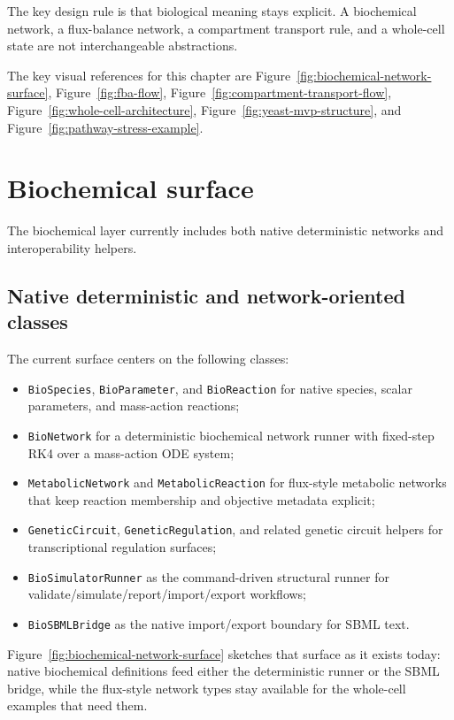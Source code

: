 The key design rule is that biological meaning stays explicit. A biochemical
network, a flux-balance network, a compartment transport rule, and a whole-cell
state are not interchangeable abstractions.

The key visual references for this chapter are Figure~\ref{fig:biochemical-network-surface},
Figure~\ref{fig:fba-flow},
Figure~\ref{fig:compartment-transport-flow},
Figure~\ref{fig:whole-cell-architecture},
Figure~\ref{fig:yeast-mvp-structure}, and
Figure~\ref{fig:pathway-stress-example}.

\section{Biochemical surface}

The biochemical layer currently includes both native deterministic networks and
interoperability helpers.

\subsection{Native deterministic and network-oriented classes}

The current surface centers on the following classes:
\begin{itemize}
\item \texttt{BioSpecies}, \texttt{BioParameter}, and \texttt{BioReaction} for
      native species, scalar parameters, and mass-action reactions;
\item \texttt{BioNetwork} for a deterministic biochemical network runner with
      fixed-step RK4 over a mass-action ODE system;
\item \texttt{MetabolicNetwork} and \texttt{MetabolicReaction} for flux-style
      metabolic networks that keep reaction membership and objective metadata
      explicit;
\item \texttt{GeneticCircuit}, \texttt{GeneticRegulation}, and related genetic
      circuit helpers for transcriptional regulation surfaces;
\item \texttt{BioSimulatorRunner} as the command-driven structural runner for
      validate/simulate/report/import/export workflows;
\item \texttt{BioSBMLBridge} as the native import/export boundary for SBML text.
\end{itemize}

Figure~\ref{fig:biochemical-network-surface} sketches that surface as it exists
today: native biochemical definitions feed either the deterministic runner or
the SBML bridge, while the flux-style network types stay available for the
whole-cell examples that need them.

